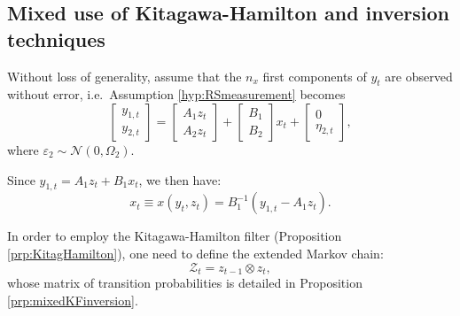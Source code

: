 \documentclass[
  12pt,
]{book}
\theoremstyle{definition}
\theoremstyle{definition}
\theoremstyle{definition}
\theoremstyle{definition}
\theoremstyle{remark}
\begin{document}
\hypertarget{MixedKitagawaHamilton}{%
\subsection{Mixed use of Kitagawa-Hamilton and inversion techniques}\label{MixedKitagawaHamilton}}

Without loss of generality, assume that the \(n_x\) first components of \(y_t\) are observed without error, i.e.~Assumption \ref{hyp:RSmeasurement} becomes
\[
\left[
\begin{array}{c}
y_{1,t}\\
y_{2,t}
\end{array}
\right]
=
\left[
\begin{array}{c}
A_{1}z_t\\
A_{2}z_t
\end{array}
\right]+
\left[
\begin{array}{c}
B_{1}\\
B_{2}
\end{array}
\right]x_t +
\left[
\begin{array}{c}
0\\
\eta_{2,t}
\end{array}
\right],
\]
where \(\varepsilon_2 \sim \mathcal{N}(0,\Omega_2)\).

Since \(y_{1,t} = A_1 z_t + B_1 x_t\), we then have:
\begin{equation}
x_t \equiv x(y_{t},z_t) = B_1^{-1}(y_{1,t} - A_1 z_t).\label{eq:xRS}
\end{equation}

In order to employ the Kitagawa-Hamilton filter (Proposition \ref{prp:KitagHamilton}), one need to define the extended Markov chain:
\[
\mathcal{Z}_t = z_{t-1} \otimes z_t,
\]
whose matrix of transition probabilities is detailed in Proposition \ref{prp:mixedKFinversion}.
\end{document}
